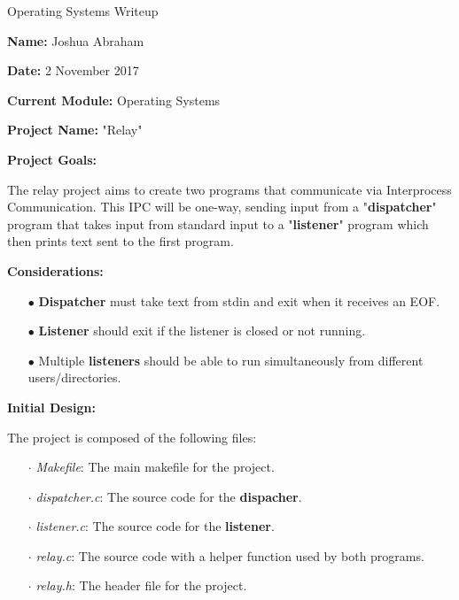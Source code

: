 \documentclass{article}
\begin{document}
\centerline{\sc \large Operating Systems Writeup}
\vspace{.5pc}

\begin{flushleft}
\textbf{Name:} Joshua Abraham
\vspace{.5pc}

\textbf{Date:} 2 November 2017
\vspace{.5pc}

\textbf{Current Module:} Operating Systems
\vspace{.5pc}

\textbf{Project Name:} "Relay"
\vspace{.5pc}

\textbf{Project Goals:}
\vspace{.5pc}
\end{flushleft}

The relay project aims to create two programs that communicate via Interprocess 
Communication.  This IPC will be one-way, sending input from a
"\textbf{dispatcher}" program 
that takes input from standard input to a "\textbf {listener}" program which 
then prints text sent to the first program.
\vspace{.5pc}

\begin{flushleft}
\textbf{Considerations:}
\vspace{.5pc}
\end{flushleft}

\begin{itemize}
	\item[$\bullet$] \textbf{Dispatcher} must take text from stdin and exit when
	it receives an EOF.
	\item[$\bullet$] \textbf{Listener} should exit if the listener is closed or
	not running.
	\item[$\bullet$] Multiple \textbf{listeners} should be able to run 
	simultaneously from different users/directories.
\end{itemize}
\vspace{.5pc}

\begin{flushleft}
\textbf{Initial Design:}
\vspace{.5pc}
\end{flushleft}

The project is composed of the following files:
\begin{itemize}
	\item [$\cdot$] \textit{Makefile}: The main makefile for the project.
	\item [$\cdot$] \textit{dispatcher.c}: The source code for the 
	\textbf{dispacher}.
	\item [$\cdot$] \textit{listener.c}: The source code for the 
	\textbf{listener}.
	\item [$\cdot$] \textit{relay.c}: The source code with a helper function
	used by both programs.
	\item [$\cdot$] \textit{relay.h}: The header file for the project.
\end{itemize}
\vspace{2mm}
\end{document}
